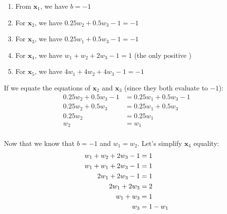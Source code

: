 


\begin{enumerate}
\item From $\mathbf{x}_1$, we have $b = -1$
\item For $\mathbf{x}_2$, we have $0.25 w_2 + 0.5 w_3 - 1 = -1$
\item For $\mathbf{x}_3$, we have $0.25 w_1 + 0.5 w_3 - 1 = -1$
\item For $\mathbf{x}_4$, we have $w_1 + w_2 + 2 w_3 - 1 = 1$ \hfill (the only positive )
\item For $\mathbf{x}_5$, we have $4 w_1 + 4 w_2 + 4 w_3 -1 = -1$
\end{enumerate}

If we equate the equations of $\mathbf{x}_2$ and $\mathbf{x}_3$ (since they both evaluate to $-1$):
\begin{align*}
    0.25 w_2 + 0.5 w_3 - 1 &= 0.25 w_1 + 0.5 w_3 - 1 \\ 
    0.25 w_2 + 0.5 w_3 &= 0.25 w_1 + 0.5 w_3 \\
    0.25 w_2 &= 0.25 w_1 \\
    w_2 &= w_1 \\
\end{align*}

Now that we know that $b = -1$ and $w_1 = w_2$. Let's simplify $\mathbf{x}_4$ equality:
\begin{align}
    w_1 + w_2 + 2 w_3 - 1 &= 1 \notag \\
    w_1 + w_1 + 2 w_3 - 1 &= 1 \notag \\
    2 w_1 + 2 w_3 - 1 &= 1 \notag \\
    2 w_1 + 2 w_3  &= 2 \notag \\
    w_1 + w_3  &= 1 \notag \\
    w_3 &= 1 - w_1 
\label{eq:svmex1}
\end{align}

